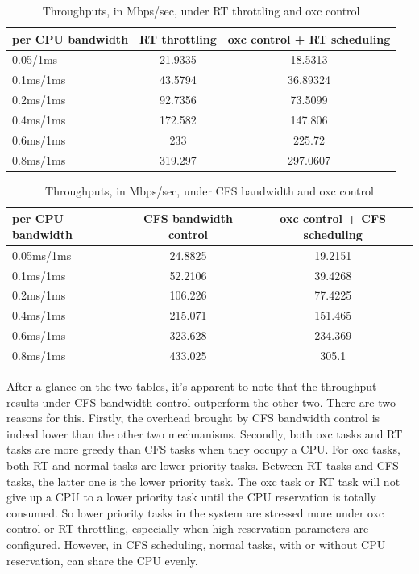\begin{table}[H]%
	\centering
	\begin{tabular}{|l||c|c|}\hline
		 per CPU bandwidth & RT throttling & oxc control + RT scheduling\\\hline
			0.05/1ms &	21.9335	&	18.5313	\\\hline 
			0.1ms/1ms &	43.5794 &	36.89324 \\\hline
			0.2ms/1ms &	92.7356 &	73.5099	\\\hline
			0.4ms/1ms &	172.582 &	147.806 \\\hline
			0.6ms/1ms &	233	&	225.72	\\\hline
			0.8ms/1ms &	319.297 &	297.0607	\\\hline
	\end{tabular}
	\caption{Throughputs, in Mbps/sec, under RT throttling and oxc control}
	\label{tab:expB1}
\end{table}
\begin{table}[H]%
	\centering
	\begin{tabular}{|l||c|c|}\hline
		 per CPU bandwidth & CFS bandwidth control & oxc control + CFS scheduling  \\\hline
		 0.05ms/1ms	& 24.8825	& 19.2151 \\\hline
		 0.1ms/1ms	& 52.2106	& 39.4268 \\\hline
		 0.2ms/1ms	& 106.226	& 77.4225 \\\hline
		 0.4ms/1ms	& 215.071	& 151.465 \\\hline
		 0.6ms/1ms	& 323.628	& 234.369 \\\hline
		 0.8ms/1ms	& 433.025	& 305.1 \\\hline
	\end{tabular}
	\caption{Throughputs, in Mbps/sec, under CFS bandwidth and oxc control}
	\label{tab:expB2}
\end{table}

After a glance on the two tables, it's apparent to note that the 
throughput results under CFS bandwidth control outperform the other two. 
There are two reasons for this. Firstly, the overhead brought by CFS 
bandwidth control is indeed lower than the other two mechnanisms.
Secondly, both oxc tasks and RT tasks are more greedy than CFS tasks when 
they occupy a CPU. For oxc tasks, both RT and normal tasks are lower
priority tasks. Between RT tasks and CFS tasks, the latter one is the 
lower priority task. The oxc task or RT task will not give up a CPU to 
a lower priority task until the CPU reservation is totally consumed. So 
lower priority tasks in the system are stressed more under oxc control 
or RT throttling, especially when high reservation parameters are configured. 
However, in CFS scheduling, normal tasks, with or without CPU reservation, 
can share the CPU evenly.

